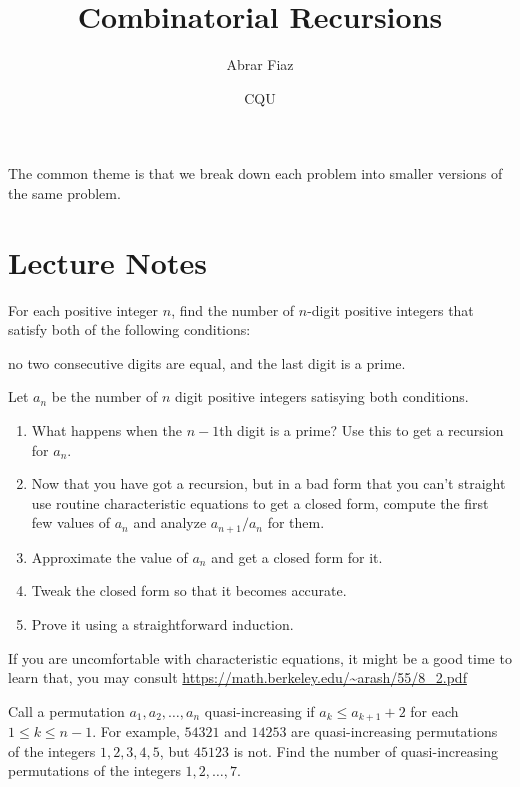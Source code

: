 \documentclass[11pt][mast]{lucky}
\title{Combinatorial Recursions}
\author{Abrar Fiaz}
\date{CQU}
\begin{document}
\maketitle

The common theme is that we break down each problem into smaller versions of the same problem.





\section{Lecture Notes}


\begin{exam}[USAJMO 2018/1]
For each positive integer $n$, find the number of $n$-digit positive integers that satisfy both of the following conditions:
\begin{itemize}
\Item no two consecutive digits are equal, and
\Item the last digit is a prime.
\end{itemize}
\end{exam}

\begin{walk}
Let $a_n$ be the number of $n$ digit positive integers satisying both conditions.

\begin{enumerate}
\item What happens when the $n-1$th digit is a prime? Use this to get a recursion for $a_n.$
\item Now that you have got a recursion, but in a bad form that you can't straight use routine characteristic equations to get a closed form, compute the first few 
values of $a_n$ and analyze $a_{n+1}/a_n$ for them.
\item Approximate the value of $a_n$ and get a closed form for it.
\item Tweak the closed form so that it becomes accurate.
\item Prove it using a straightforward induction. 
\end{enumerate}
\end{walk}

If you are uncomfortable with characteristic equations, it might be a good time to learn that, you may consult  \href{}{\url{https://math.berkeley.edu/~arash/55/8_2.pdf}}


\begin{exam}[AIME 2015 II/10]
Call a permutation $a_1,a_2,\ldots,a_n$ quasi-increasing if $a_k\le a_{k+1}+2$ for each $1\le k\le n-1$. For example, $54321$ and $14253$ are quasi-increasing permutations of the integers $1,2,3,4,5$, but $45123$ is not. Find the number of quasi-increasing permutations of the integers $1,2,\ldots,7$.
\end{exam}
\end{document}
